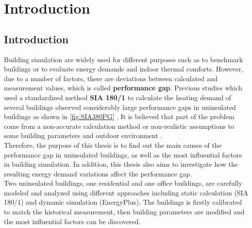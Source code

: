 \chapter{Introduction}\label{sec:introduction}

\section{Introduction}
	
		Building simulation are widely used for different purposes such as to benchmark buildings or to evaluate energy demands and indoor thermal comforts. However, due to a number of factors, there are deviations between calculated  and measurement values, which is called \textbf{performance gap}. Previous studies which used a standardized method \textbf{SIA 180/1} to calculate the heating demand of several buildings observed considerably large performance gaps in uninsulated buildings as shown in \ref{fig:SIA380PG} \cite{SIAPreviousreport}. It is believed that part of the problem come from a non-accurate calculation method or non-realistic assumptions to some building parameters and outdoor environment \cite{SIAPreviousreport}. \\
	
	
		Therefore, the purpose of this thesis is to find out the main causes of the performance gap in uninsulated buildings, as well as the most influential factors in building simulation. In addition, this thesis also aims to investigate how the resulting energy demand variations affect the performance gap.\\

	
		Two uninsulated buildings, one residential and one office buildings, are carefully modeled and analyzed using different approaches including static calculation (SIA 180/1) and dynamic simulation (EnergyPlus). The buildings is firstly calibrated to match the historical measurement, then building parameters are modified and the most influential factors can be discovered.\\

